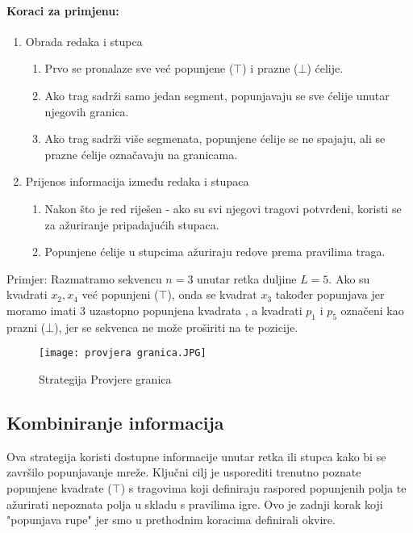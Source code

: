 \documentclass[a4paper,12pt]{article}
\begin{document}
\paragraph{Koraci za primjenu:}  
\begin{enumerate}
    \item Obrada redaka i stupca
    \begin{enumerate}
        \item Prvo se pronalaze sve već popunjene ($\top$) i prazne ($\bot$) ćelije.
        \item Ako trag sadrži samo jedan segment, popunjavaju se sve ćelije unutar njegovih granica.
        \item Ako trag sadrži više segmenata, popunjene ćelije se ne spajaju, ali se prazne ćelije označavaju na granicama. 
    \end{enumerate}
    \item Prijenos informacija između redaka i stupaca 
    \begin{enumerate}
        \item Nakon što je red riješen - ako su svi njegovi tragovi potvrđeni, koristi se za ažuriranje pripadajućih stupaca.
        \item Popunjene ćelije u stupcima ažuriraju redove prema pravilima traga.
    \end{enumerate}
\end{enumerate}

Primjer:  
Razmatramo sekvencu $n = 3$ unutar retka duljine $L = 5$. Ako su kvadrati $x_2, x_4$ već popunjeni ($\top$), onda se kvadrat $x_3$ također popunjava jer moramo imati 3 uzastopno popunjena kvadrata , a kvadrati $p_1$ i $p_5$ označeni kao prazni ($\bot$), jer se sekvenca ne može proširiti na te pozicije.

\begin{figure}[h]
\centering
\texttt{[image: provjera granica.JPG]}
\caption{Strategija Provjere granica}
\end{figure}

\subsection{Kombiniranje informacija}  
Ova strategija koristi dostupne informacije unutar retka ili stupca kako bi se završilo popunjavanje mreže. Ključni cilj je usporediti trenutno poznate popunjene kvadrate ($\top$) s tragovima koji definiraju raspored popunjenih polja te ažurirati nepoznata polja u skladu s pravilima igre.
Ovo je zadnji korak koji "popunjava rupe" jer smo u prethodnim koracima definirali okvire.
 
\end{document}
